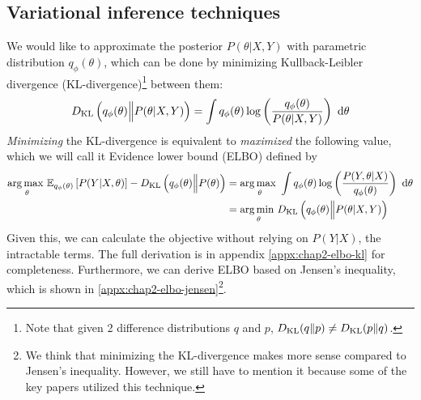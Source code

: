 \subsection{Variational inference techniques}
\label{sec:chap2-vi-technique}
We would like to approximate the posterior $P(\theta | X, Y)$ with parametric distribution $q_{\phi} (\theta)$, which can be done by minimizing Kullback-Leibler divergence (KL-divergence)\footnote{Note that given 2 difference distributions $q$ and $p$, $D_{\mathrm{KL}}(q \| p) \ne D_{\mathrm{KL}}(p \| q)$.} between them:
\begin{equation}
    D_{\mathrm{KL}}\left( q_{\phi} (\theta) \Big\| P(\theta | X, Y) \right) = \int q_{\phi} (\theta) \log\left( \frac{q_{\phi} (\theta)}{P(\theta | X, Y)} \right) \ \mathrm{d} \theta
\end{equation}
\textit{Minimizing} the KL-divergence is equivalent to \textit{maximized} the following value, which we will call it Evidence lower bound (ELBO) defined by
\begin{equation}
\begin{aligned}
    \underset{\theta}{\arg\max \ } \mathbb{E}_{q_{\phi} (\theta)} \left[ P(Y | X, \theta) \right] - D_{\mathrm{KL}} \left(q_{\phi} (\theta) \Big\| P(\theta) \right) &= \underset{\theta}{\arg\max \ } \int q_{\phi}(\theta)\log\left(\frac{P(Y, \theta | X)}{q_{\phi}(\theta)}\right) \ \mathrm{d} \theta \\
    &= \underset{\theta }{\arg\min \ } D_{\mathrm{KL}}\left( q_{\phi} (\theta) \Big\| P(\theta | X, Y) \right)
\end{aligned}
\end{equation}
Given this, we can calculate the objective without relying on $P(Y | X)$, the intractable terms. The full derivation is in appendix \ref{appx:chap2-elbo-kl} for completeness. Furthermore, we can derive ELBO based on Jensen's inequality, which is shown in \ref{appx:chap2-elbo-jensen}\footnote{We think that minimizing the KL-divergence makes more sense compared to Jensen's inequality. However, we still have to mention it because some of the key papers utilized this technique.}. 


